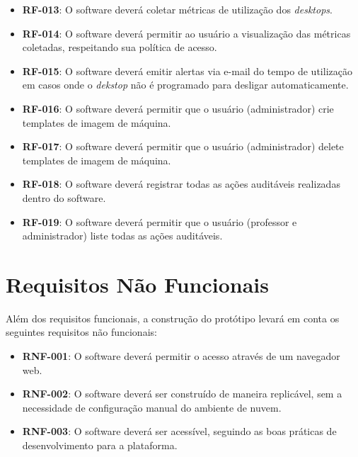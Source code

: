 \begin{itemize}
    \item \textbf{RF-013}: O software deverá coletar métricas de utilização dos \textit{desktops}.
    
    \item \textbf{RF-014}: O software deverá permitir ao usuário a visualização das métricas coletadas, respeitando sua política de acesso.
    
    \item \textbf{RF-015}: O software deverá emitir alertas via e-mail do tempo de utilização em casos onde o \textit{dekstop} não é programado para desligar automaticamente.
    
    \item \textbf{RF-016}: O software deverá permitir que o usuário (administrador) crie templates de imagem de máquina.
    
    \item \textbf{RF-017}: O software deverá permitir que o usuário (administrador) delete templates de imagem de máquina.

    \item \textbf{RF-018}: O software deverá registrar todas as ações auditáveis realizadas dentro do software.

    \item  \textbf{RF-019}: O software deverá permitir que o usuário (professor e administrador) liste todas as ações auditáveis.
    
\end{itemize}

\section{Requisitos Não Funcionais}\label{sec:requisitosFuncionais}

Além dos requisitos funcionais, a construção do protótipo levará em conta os seguintes requisitos não funcionais:

\begin{itemize}
    \item \textbf{RNF-001}: O software deverá permitir o acesso através de um navegador web.

    \item \textbf{RNF-002}: O software deverá ser construído de maneira replicável, sem a necessidade de configuração manual do ambiente de nuvem.

    \item \textbf{RNF-003}: O software deverá ser acessível, seguindo as boas práticas de desenvolvimento para a plataforma.
\end{itemize}


